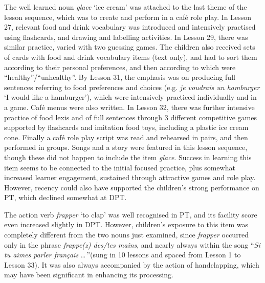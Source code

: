 \documentclass[output=paper]{langscibook}
\begin{document}
The well learned noun \textit{glace} `ice cream' was attached to the last theme of the lesson sequence, which was to create and perform in a café role play. In Lesson 27, relevant food and drink vocabulary was introduced and intensively practised using flashcards, and drawing and labelling activities. In Lesson 29, there was similar practice, varied with two guessing games. The children also received sets of cards with food and drink vocabulary items (text only), and had to sort them according to their personal preferences, and then according to which were ``healthy''\slash``unhealthy''. By Lesson 31, the emphasis was on producing full sentences referring to food preferences and choices (e.g. \textit{je voudrais un hamburger} `I would like a hamburger'), which were intensively practiced individually and in a game. Café menus were also written. In Lesson 32, there was further intensive practice of food lexis and of full sentences through 3 different competitive games supported by flashcards and imitation food toys, including a plastic ice cream cone. Finally a café role play script was read and rehearsed in pairs, and then performed in groups. Songs and a story were featured in this lesson sequence, though these did not happen to include the item \textit{glace}. Success in learning this item seems to be connected to the initial focused practice, plus somewhat increased learner engagement, sustained through attractive games and role play. However, recency could also have supported the children’s strong performance on PT, which declined somewhat at DPT.

The action verb \textit{frapper} `to clap' was well recognised in PT, and its facility score even increased slightly in DPT. However, children’s exposure to this item was completely different from the two nouns just examined, since \textit{frapper} occurred only in the phrase \textit{frappe(z) des/tes mains}, and nearly always within the song ``\textit{Si tu aimes parler français} \ldots\,''(sung in 10 lessons and spaced from Lesson 1 to Lesson 33). It was also always accompanied by the action of handclapping, which may have been significant in enhancing its processing.
\end{document}
